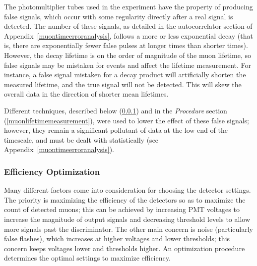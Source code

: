 The photomultiplier tubes used in the experiment have the property of producing false signals, which occur with some regularity directly after a real signal is detected. The number of these signals, as detailed in the autocorrelator section of Appendix~\ref{muontimeerroranalysis}, follows a more or less exponential decay (that is, there are exponentially fewer false pulses at longer times than shorter times). However, the decay lifetime is on the order of magnitude of the muon lifetime, so false signals may be mistaken for events and affect the lifetime measurement. For instance, a false signal mistaken for a decay product will artificially shorten the measured lifetime, and the true signal will not be detected.  This will skew the overall data in the direction of shorter mean lifetimes.

Different techniques, described below (\ref{efficiencyoptimization}) and in the \emph{Procedure} section (\ref{muonlifetimemeasurement}), were used to lower the effect of these false signals; however, they remain a significant pollutant of data at the low end of the timescale, and must be dealt with statistically (see Appendix~\ref{muontimeerroranalysis}).

\subsubsection{Efficiency Optimization}
\label{efficiencyoptimization}

Many different factors come into consideration for choosing the detector settings. The priority is maximizing the efficiency of the detectors so as to maximize the count of detected muons; this can be achieved by increasing PMT voltages to increase the magnitude of output signals and decreasing threshold levels to allow more signals past the discriminator. The other main concern is noise (particularly false flashes), which increases at higher voltages and lower thresholds; this concern keeps voltages lower and thresholds higher. An optimization procedure determines the optimal settings to maximize efficiency.

